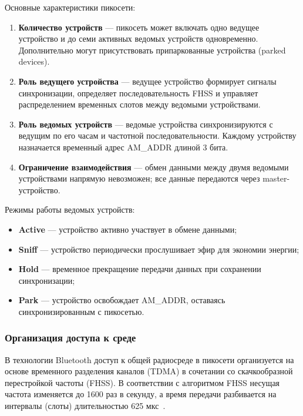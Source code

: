 Основные характеристики пикосети:
\begin{enumerate}[nosep]
    \item \textbf{Количество устройств} --- пикосеть может включать одно ведущее устройство и до семи активных ведомых устройств одновременно. Дополнительно могут присутствовать припаркованные устройства (parked devices).

    \item \textbf{Роль ведущего устройства} --- ведущее устройство формирует сигналы синхронизации, определяет последовательность FHSS и управляет распределением временных слотов между ведомыми устройствами.

    \item \textbf{Роль ведомых устройств} --- ведомые устройства синхронизируются с ведущим по его часам и частотной последовательности. Каждому устройству назначается временный адрес AM\_ADDR длиной 3 бита.

    \item \textbf{Ограничение взаимодействия} --- обмен данными между двумя ведомыми устройствами напрямую невозможен; все данные передаются через master-устройство.
\end{enumerate}

Режимы работы ведомых устройств:
\begin{itemize}[nosep]
    \item \textbf{Active} --- устройство активно участвует в обмене данными;
    \item \textbf{Sniff} --- устройство периодически прослушивает эфир для экономии энергии;
    \item \textbf{Hold} --- временное прекращение передачи данных при сохранении синхронизации;
    \item \textbf{Park} --- устройство освобождает AM\_ADDR, оставаясь синхронизированным с пикосетью.
\end{itemize}

\subsubsection{Организация доступа к среде}

В технологии Bluetooth доступ к общей радиосреде в пикосети организуется на основе временного разделения каналов (TDMA) в сочетании со скачкообразной перестройкой частоты (FHSS). В соответствии с алгоритмом FHSS несущая частота изменяется до 1600 раз в секунду, а время передачи разбивается на интервалы (слоты) длительностью 625 мкс~\cite{bluetooth_core53}.

